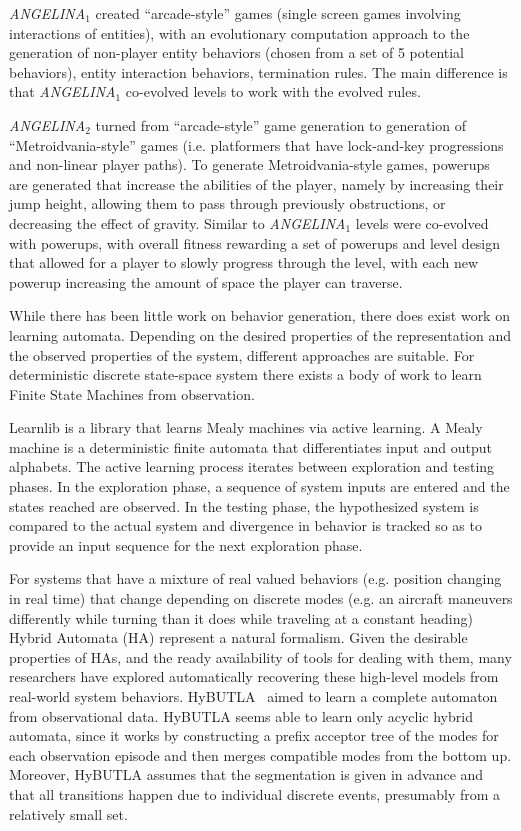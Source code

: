 \documentclass[12pt]{report}
\begin{document}
\textit{ANGELINA}$_{1}$ created ``arcade-style'' games (single screen games involving interactions of entities), with an evolutionary computation approach to the generation of non-player entity behaviors (chosen from a set of 5 potential behaviors), entity interaction behaviors, termination rules. The main difference is that \textit{ANGELINA}$_{1}$  co-evolved levels to work with the evolved rules.

\textit{ANGELINA}$_{2}$ turned from ``arcade-style'' game generation to generation of ``Metroidvania-style'' games (i.e. platformers that 
have lock-and-key progressions and non-linear player paths).  To generate Metroidvania-style games, powerups are generated that increase the abilities of the player, namely by increasing their jump height, allowing them to pass through previously obstructions, or decreasing the effect of gravity.  Similar to \textit{ANGELINA}$_{1}$ levels were co-evolved with powerups, with overall fitness rewarding a set of powerups and level design that allowed for a player to slowly progress through the level, with each new powerup increasing the amount of space the player can traverse.

While there has been little work on behavior generation, there does exist work on learning automata. Depending on the desired properties of the representation and the observed properties of the system, different approaches are suitable.  For deterministic discrete state-space system there exists a body of work to learn Finite State Machines from observation.  

Learnlib \cite{Introduction to Active Automata Learning from
a Practical Perspective?} is a library that learns Mealy machines via active learning.  A Mealy machine is a deterministic finite automata that differentiates input and output alphabets. The active learning process iterates between exploration and testing phases.  In the exploration phase, a sequence of system inputs are entered and the states reached are observed.  In the testing phase, the hypothesized system is compared to the actual system and divergence in behavior is tracked so as to provide an input sequence for the next exploration phase.

For systems that have a mixture of real valued behaviors (e.g. position changing in real time) that change depending on discrete modes (e.g. an aircraft maneuvers differently while turning than it does while traveling at a constant heading) Hybrid Automata (HA) represent a natural formalism. 
Given the desirable properties of HAs, and the ready availability of tools for dealing with them, many researchers have explored automatically recovering these high-level models from real-world system behaviors.
HyBUTLA~\cite{niggemann2012learning} aimed to learn a complete automaton from observational data. HyBUTLA seems able to learn only acyclic hybrid automata, since it works by constructing a prefix acceptor tree of the modes for each observation episode and then merges compatible modes from the bottom up. Moreover, HyBUTLA assumes that the segmentation is given in advance and that all transitions happen due to individual discrete events, presumably from a relatively small set.
\end{document}
